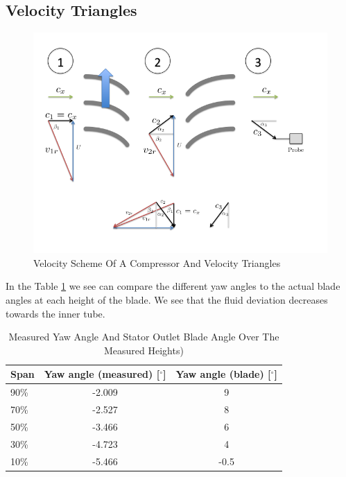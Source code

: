 \subsection{Velocity Triangles}

\begin{figure}[H]
\centering
\includegraphics[width=\textwidth]{dreiecke.png}
\caption{Velocity Scheme Of A Compressor And Velocity Triangles}
\label{fig:dreiecke}
\end{figure}

In the Table \ref{tab:t1} we see can compare the different yaw angles to the actual blade angles at each height of the blade. We see that the fluid deviation decreases towards the inner tube.

\begin{table}[H]
\centering
    \begin{tabular}{|l|c|c|}
        \hline
        Span & Yaw angle (measured) [$^\circ$] & Yaw angle (blade) [$^\circ$] \\ \hline
        90\%  & -2.009                   & 9                     \\ 
        70\%  & -2.527                   & 8                     \\ 
        50\%  & -3.466                   & 6                     \\ 
        30\%  & -4.723                   & 4                     \\ 
        10\%  & -5.466                   & -0.5                  \\
        \hline
    \end{tabular}
\caption{Measured Yaw Angle And Stator Outlet Blade Angle Over The Measured Heights)}
\label{tab:t1}
\end{table}

